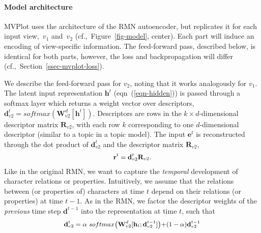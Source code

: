 \documentclass[11pt,letterpaper]{article}
\begin{document}
\paragraph{Model architecture} \mbox{MVPlot} uses the architecture of the RMN autoencoder, but replicates it for each input view,~$v_1$ and~$v_2$ (cf.,~Figure~\ref{fig-model}, center). Each part will induce an encoding of view-specific information. The feed-forward pass, described below, is identical for both parts, however, the loss and backpropagation will differ (cf.,~Section~\ref{ssec-mvplot-loss}). 

We describe the feed-forward pass for $v_2$, noting that it works analogously for $v_1$. The latent input representation $\mathbf{h}^t$ (eqn~(\ref{eqn-hidden})) is passed through a softmax layer which returns a weight vector over descriptors,~\mbox{$\mathbf{d}_{v2}^t=softmax(\mathbf{W}^d_{v2}[\mathbf{h}^t])$}. Descriptors are rows in the $k\times d$-dimensional descriptor matrix $\mathbf{R}_{v2}$, with each row $k$ corresponding to one $d$-dimensional descriptor (similar to a topic in a topic model). The input $\mathbf{e}^t$ is reconstructed through the dot product of $\mathbf{d}^t_{v2}$ and the descriptor matrix $\mathbf{R}_{v2}$, 
\begin{equation}
\small
 \begin{aligned}
  \mathbf{r}^t = \mathbf{d}^t_{v2} \mathbf{R}_{v2}.
 \end{aligned}
\end{equation}
Like in the original RMN, we want to capture the {\it temporal} development of character relations or properties. Intuitively, we assume that the relations between (or properties of) characters at time $t$ depend on their relations (or properties) at time $t-1$. As in the RMN, we factor the descriptor weights of the {\it previous} time step $\mathbf{d}^{t-1}$ into the representation at time $t$, such that
\begin{equation}
\small
 \begin{aligned}
  \mathbf{d}_{v2}^t=\alpha\ softmax\big(\mathbf{W}_{v2}^d[\mathbf{h}_t;\mathbf{d}_{v2}^{t-1}]\big){+}(1-\alpha)\mathbf{d}_{v2}^{t-1}
 \end{aligned}
\end{equation}
\end{document}
